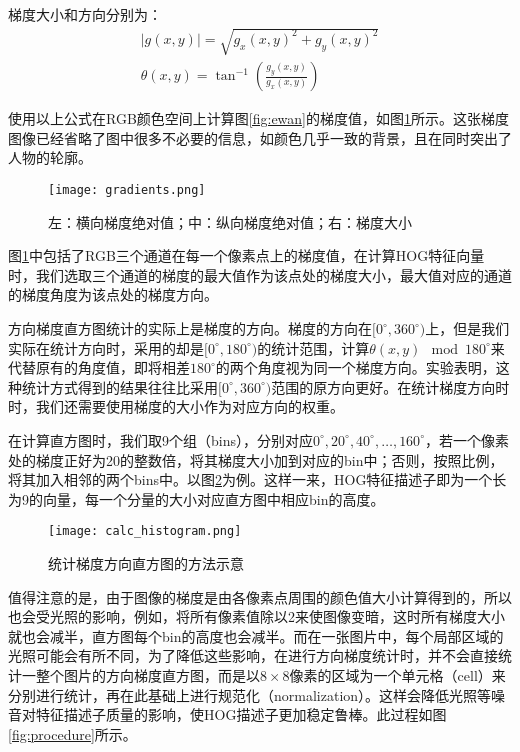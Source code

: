   梯度大小和方向分别为：
\begin{gather*}
|g(x,y)|=\sqrt{g_x (x,y)^2 + g_y (x,y)^2} \\
\theta (x,y)=\tan^{-1}\left(\frac{g_y(x,y)}{g_x(x,y)}\right)
\end{gather*}
  
  使用以上公式在RGB颜色空间上计算图\ref{fig:ewan}的梯度值，如图\ref{fig:gradients}所示。这张梯度图像已经省略了图中很多不必要的信息，如颜色几乎一致的背景，且在同时突出了人物的轮廓。

\begin{figure}[htb]
  \centering
  \texttt{[image: gradients.png]}
  \caption{左：横向梯度绝对值；中：纵向梯度绝对值；右：梯度大小}
  \label{fig:gradients}
\end{figure}

  图\ref{fig:gradients}中包括了RGB三个通道在每一个像素点上的梯度值，在计算HOG特征向量时，我们选取三个通道的梯度的最大值作为该点处的梯度大小，最大值对应的通道的梯度角度为该点处的梯度方向。

  方向梯度直方图统计的实际上是梯度的方向。梯度的方向在$[0^{\circ},360^{\circ})$上，但是我们实际在统计方向时，采用的却是$[0^{\circ},180^{\circ})$的统计范围，计算$\theta(x,y) \mod 180^{\circ}$来代替原有的角度值，即将相差$180^{\circ}$的两个角度视为同一个梯度方向。实验表明，这种统计方式得到的结果往往比采用$[0^{\circ},360^{\circ})$范围的原方向更好\cite{dalal2005histograms}。在统计梯度方向时时，我们还需要使用梯度的大小作为对应方向的权重。

  在计算直方图时，我们取9个组（bins），分别对应$0^{\circ},20^{\circ},40^{\circ},\dots,160^{\circ}$，若一个像素处的梯度正好为20的整数倍，将其梯度大小加到对应的bin中；否则，按照比例，将其加入相邻的两个bins中。以图\ref{fig:distribute}为例。这样一来，HOG特征描述子即为一个长为9的向量，每一个分量的大小对应直方图中相应bin的高度。

\begin{figure}[htb]
  \centering
  \texttt{[image: calc\_histogram.png]}
  \caption{统计梯度方向直方图的方法示意}
  \label{fig:distribute}
\end{figure}

  值得注意的是，由于图像的梯度是由各像素点周围的颜色值大小计算得到的，所以也会受光照的影响，例如，将所有像素值除以2来使图像变暗，这时所有梯度大小就也会减半，直方图每个bin的高度也会减半。而在一张图片中，每个局部区域的光照可能会有所不同，为了降低这些影响，在进行方向梯度统计时，并不会直接统计一整个图片的方向梯度直方图，而是以$8\times8$像素的区域为一个单元格（cell）来分别进行统计，再在此基础上进行规范化（normalization）。这样会降低光照等噪音对特征描述子质量的影响，使HOG描述子更加稳定鲁棒。此过程如图\ref{fig:procedure}所示。

